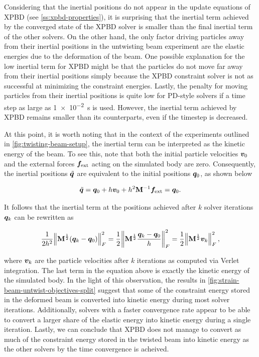 Considering that the inertial positions do not appear in the update equations of XPBD (see \cref{ss:xpbd-properties}), it is surprising that the inertial term achieved 
by the converged state of the XPBD solver is smaller than the final inertial term of the other solvers. On the other hand, the only factor driving particles away from 
their inertial positions in the untwisting beam experiment are the elastic energies due to the deformation of the beam. One possible explanation for the low inertial 
term for XPBD might be that the particles do not move far away from their inertial positions simply because the XPBD constraint solver is not as successful at 
minimizing the constraint energies. Lastly, the penalty for moving particles from their inertial positions is quite low for PD-style solvers if a time step as large 
as \SI{1e-2}{\second} is used. However, the inertial term achieved by XPBD remains smaller than its counterparts, even if the timestep is decreased.

At this point, it is worth noting that in the context of the experiments outlined in \autoref{fig:twisting-beam-setup}, the inertial term can be interpreted as the 
kinetic energy of the beam. To see this, note that both the initial particle velocities 
$\bm{v}_0$ and the external forces $\bm{f}_{\text{ext}}$ acting on the simulated body are zero. Consequently, the inertial positions $\tilde{\bm{q}}$ are 
equivalent to the initial positions $\bm{q}_0$, as shown below

\[ 
    \tilde{\bm{q}} = \bm{q}_0 + h\bm{v}_0 + h^2\mathbf{M}^{-1}\bm{f}_{\text{ext}} = \bm{q}_0.
\]

\noindent It follows that the inertial term at the positions achieved after $k$ solver iterations $\bm{q}_k$ can be rewritten as

\[
    \frac{1}{2h^2} \norm{\mathbf{M}^{\frac{1}{2}}(\bm{q}_k - \bm{q}_0)}^2_F 
    = \frac{1}{2} \norm{\mathbf{M}^{\frac{1}{2}}\frac{\bm{q}_k - \bm{q}_0}{h}}^2_F
    = \frac{1}{2} \norm{\mathbf{M}^{\frac{1}{2}}\bm{v}_k}^2_F,
\]

\noindent where $\bm{v}_k$ are the particle velocities after $k$ iterations as computed via Verlet integration. The last term in the equation above is exactly the 
kinetic energy of the simulated body. In the light of this observation, the results in \autoref{fig:strain-beam-untwist-objectives-split} suggest that some of the 
constraint energy stored in the deformed beam is converted into kinetic energy during most solver iterations. Additionally, solvers with a 
faster convergence rate appear to be able to convert a larger share of the elastic energy into kinetic energy during a single iteration. Lastly, we can conclude that XPBD 
does not manage to convert as much of the constraint energy stored in the twisted beam into kinetic energy as the other solvers by the time convergence is acheived.

